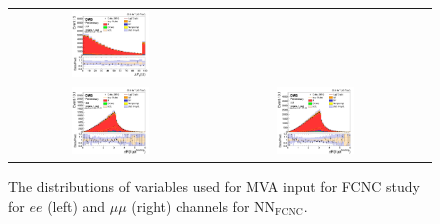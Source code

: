 \begin{figure}[ht]
\begin{center}
\begin{tabular}{ccc}
      \includegraphics[width=0.4\textwidth]{figures/tW/fig/FCNC_MVA_input/mumu/H_BSM_xj1b_dPt_l1_l2.png}\\
      \includegraphics[width=0.4\textwidth]{figures/tW/fig/FCNC_MVA_input/ee/H_BSM_xj1b_dR_ll_j1.png}&
      \includegraphics[width=0.4\textwidth]{figures/tW/fig/FCNC_MVA_input/mumu/H_BSM_xj1b_dR_ll_j1.png}\\
    \end{tabular}
    \caption{The distributions of variables used for MVA input for FCNC study for $ee$ (left) and $\mu\mu$ (right) channels for NN$_{\text{FCNC}}$.
    \label{fig:MVA_FCNC_1j1t_2}}
  \end{center}
\end{figure}
\clearpage

